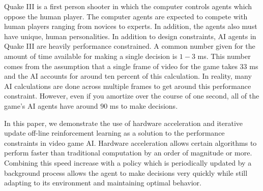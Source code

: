 Quake III is a first person shooter in which the computer controls agents which oppose the human player. The computer agents are expected to compete with human players ranging from novices to experts. In addition, the agents also must have unique, human personalities. In addition to design constraints, AI agents in Quake III are heavily performance constrained. A common number given for the amount of time available for making a single decision is $1-3$ ms. \cite{game:ai:lecture} This number comes from the assumption that a single frame of video for the game takes $33$ ms and the AI accounts for around ten percent of this calculation. In reality, many AI calculations are done across multiple frames to get around this performance constraint. However, even if you amortize over the course of one second, all of the game's AI agents have around $90$ ms to make decisions.

In this paper, we demonstrate the use of hardware acceleration and iterative update off-line reinforcement learning as a solution to the performance constraints in video game AI. Hardware acceleration allows certain algorithms to perform faster than traditional computation by an order of magnitude or more. Combining this speed increase with a policy which is periodically updated by a background process allows the agent to make decisions very quickly while still adapting to its environment and maintaining optimal behavior.
